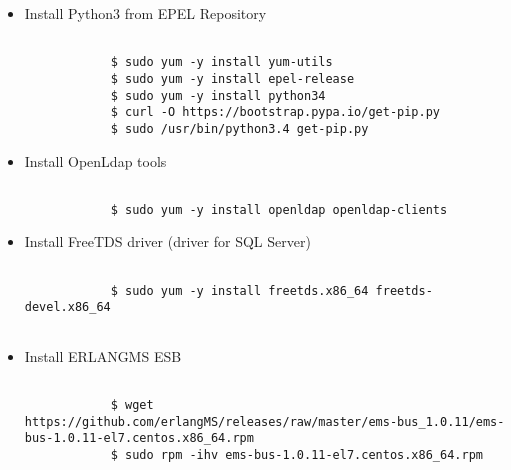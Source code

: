 \begin{itemize}
\begin{lstlisting}[Adding Erlang repository entry, label=install_erlang]
		\end{lstlisting}
	

	\item Install Python3 from EPEL Repository
	
	
		\renewcommand{\lstlistingname}{Código}             
		\begin{lstlisting}[Adding Erlang repository entry, label=install_py] 

			$ sudo yum -y install yum-utils
			$ sudo yum -y install epel-release 
			$ sudo yum -y install python34 
			$ curl -O https://bootstrap.pypa.io/get-pip.py
			$ sudo /usr/bin/python3.4 get-pip.py 

		\end{lstlisting}
	

	\item Install OpenLdap tools 
	
		\renewcommand{\lstlistingname}{Código}             
		\begin{lstlisting}[Adding Erlang repository entry, label=install_openldaptools] 

			$ sudo yum -y install openldap openldap-clients

		\end{lstlisting}
	

	\item Install FreeTDS driver (driver for SQL Server)
	
		\renewcommand{\lstlistingname}{Código}             
		\begin{lstlisting}[Adding Erlang repository entry, label=install_freetds] 

			$ sudo yum -y install freetds.x86_64 freetds-devel.x86_64
			
		\end{lstlisting}
		
	
	\item Install ERLANGMS ESB
	
		\renewcommand{\lstlistingname}{Código}             
		\begin{lstlisting}[Adding Erlang repository entry, label=install_emsbus] 

			$ wget https://github.com/erlangMS/releases/raw/master/ems-bus_1.0.11/ems-bus-1.0.11-el7.centos.x86_64.rpm
			$ sudo rpm -ihv ems-bus-1.0.11-el7.centos.x86_64.rpm 

		\end{lstlisting}
	
	
\end{itemize}




